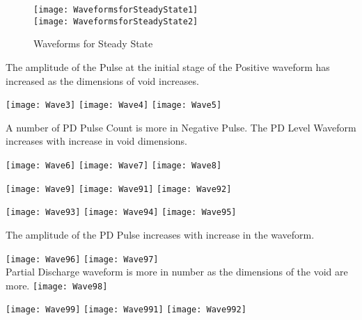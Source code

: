 \begin{figure}[h!]
    \centering
    \texttt{[image: WaveformsforSteadyState1]}\\
    \vspace{1cm}
    \texttt{[image: WaveformsforSteadyState2]}
    \caption{Waveforms for Steady State}
    \label{fig:Waveforms for Steady State}
\end{figure}

The amplitude of the Pulse at the initial stage of the Positive waveform has increased as the dimensions of void increases.

\begin{center}
\texttt{[image: Wave3]}
\vfill
\texttt{[image: Wave4]}
\vfill
\texttt{[image: Wave5]}
\end{center}
A number of PD Pulse Count is more in Negative Pulse.
The PD Level Waveform increases with increase in void dimensions.
\pagebreak

\begin{center}
\texttt{[image: Wave6]}
\vfill
\texttt{[image: Wave7]}
\vfill
\texttt{[image: Wave8]}
\end{center}

\pagebreak
\begin{center}
\texttt{[image: Wave9]}
\vfill
\texttt{[image: Wave91]}
\vfill
\texttt{[image: Wave92]}
\end{center}

\pagebreak
\begin{center}
\texttt{[image: Wave93]}
\vfill
\texttt{[image: Wave94]}
\vfill
\texttt{[image: Wave95]}
\end{center}

The amplitude of the PD Pulse increases with increase in the waveform.

\pagebreak
\begin{center}
\texttt{[image: Wave96]}
\vfill
\texttt{[image: Wave97]}\\
Partial Discharge waveform is more in number as the dimensions of the void are more.
\vfill
\texttt{[image: Wave98]}
\end{center}

\pagebreak
\begin{center}
\texttt{[image: Wave99]}
\vfill
\texttt{[image: Wave991]}
\vfill
\texttt{[image: Wave992]}
\end{center}

